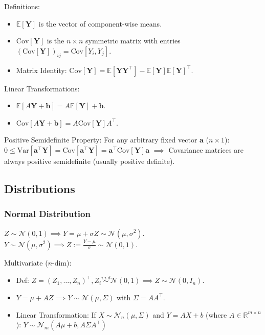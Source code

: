 Definitions:
\begin{itemize}
    \item $\mathbb{E}[\mathbf{Y}]$ is the vector of component-wise means.
    \item $\text{Cov}[\mathbf{Y}]$ is the $n \times n$ symmetric matrix with entries $(\text{Cov}[\mathbf{Y}])_{ij} = \text{Cov}[Y_i, Y_j]$.
    \item Matrix Identity: $\text{Cov}[\mathbf{Y}] = \mathbb{E}[\mathbf{Y}\mathbf{Y}^\top] - \mathbb{E}[\mathbf{Y}]\mathbb{E}[\mathbf{Y}]^\top$.
\end{itemize}

Linear Transformations:
\begin{itemize}
    \item $\mathbb{E}[A\mathbf{Y} + \mathbf{b}] = A\mathbb{E}[\mathbf{Y}] + \mathbf{b}$.
    \item $\text{Cov}[A\mathbf{Y} + \mathbf{b}] = A \text{Cov}[\mathbf{Y}] A^\top$.
\end{itemize}

Positive Semidefinite Property:
For any arbitrary fixed vector $\mathbf{a}$ ($n \times 1$):
$ 0 \leq \text{Var}[\mathbf{a}^\top \mathbf{Y}] = \text{Cov}[\mathbf{a}^\top \mathbf{Y}] = \mathbf{a}^\top \text{Cov}[\mathbf{Y}] \mathbf{a} $
$\implies$ Covariance matrices are always positive semidefinite (usually positive definite).

\subsection{Distributions}

\subsubsection{Normal Distribution}
$Z \sim \mathcal{N}(0,1) \implies Y = \mu + \sigma Z \sim \mathcal{N}(\mu, \sigma^2)$.
\\$Y \sim \mathcal{N}(\mu, \sigma^2) \implies Z := \frac{Y-\mu}{\sigma} \sim \mathcal{N}(0,1)$.

Multivariate ($n$-dim):
\begin{itemize}
    \item Def: $Z = (Z_1, \dots, Z_n)^\top, Z_i \overset{i.i.d}{\sim} \mathcal{N}(0,1) \implies Z \sim \mathcal{N}(0, I_n)$.
    \item $Y = \mu + AZ \implies Y \sim \mathcal{N}(\mu, \Sigma)$ with $\Sigma = AA^\top$.
    \item Linear Transformation: If $X \sim \mathcal{N}_n(\mu, \Sigma)$ and $Y = AX + b$ (where $A \in \mathbb{R}^{m \times n}$):
    $Y \sim \mathcal{N}_m(A\mu + b, A\Sigma A^\top) $
\end{itemize}

